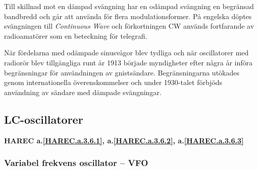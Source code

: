Till skillnad mot en dämpad svängning har en odämpad svängning en begränsad
bandbredd och går att använda för flera modulationsformer.
På engelska döptes svängningen till \emph{Continuous Wave} och förkortningen CW
används fortfarande av radioamatörer som en beteckning för telegrafi.

När fördelarna med odämpade sinusvågor blev tydliga och när oscillatorer med
radiorör blev tillgängliga runt år 1913 började myndigheter efter några år
införa begränsningar för användningen av gnistsändare.
Begränsningarna utökades genom internationella överenskommelser och under
1930-talet förbjöds användning av sändare med dämpade svängningar.

\subsection{LC-oscillatorer}
\textbf{HAREC a.\ref{HAREC.a.3.6.1}, a.\ref{HAREC.a.3.6.2}, a.\ref{HAREC.a.3.6.3}\label{myHAREC.a.3.6.1}\label{myHAREC.a.3.6.2}\label{myHAREC.a.3.6.3}}

\subsubsection{Variabel frekvens oscillator -- VFO}

